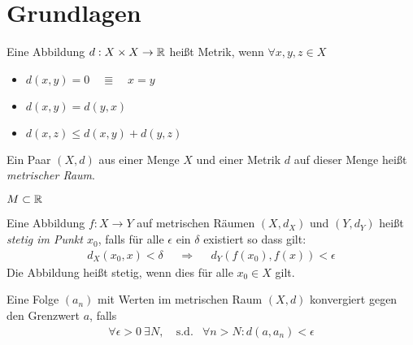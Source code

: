 \section{Grundlagen}
\begin{dfn}
    Eine Abbildung $d: X \times X \to \mathbb{R}$ heißt Metrik, wenn
    $\forall x,y,z \in X$
    \begin{itemize}
    \item $d(x, y) = 0 \quad \Equiv \quad x = y$
    \item $d(x, y) = d(y, x)$
    \item $d(x, z) \leq d(x, y) + d(y, z)$
    \end{itemize}
    Ein Paar $(X, d)$ aus einer Menge $X$ und einer Metrik $d$ auf dieser
    Menge heißt \emph{metrischer Raum}.    
\end{dfn}

\begin{bsp}
\end{bsp}

\begin{bsp}
\end{bsp}

\begin{bsp}[Unterraummetrik]
\end{bsp}

\begin{bsp}
    $M \subset \mathbb{R}$
\end{bsp}

\begin{dfn}[Stetigkeit]
    Eine Abbildung $f: X \to Y$ auf metrischen Räumen $(X,d_X)$ und $(Y, d_Y)$
    heißt \emph{stetig im Punkt $x_0$}, falls für alle $\epsilon$ ein $\delta$
    existiert so dass gilt:
    \begin{align*}
        d_X(x_0, x) < \delta& &\Rightarrow& &d_Y(f(x_0), f(x)) < \epsilon
    \end{align*}
    Die Abbildung heißt stetig, wenn dies für alle $x_0\in X$ gilt.
\end{dfn}

\begin{dfn}[Folgenkonvergenz]
    Eine Folge $(a_n)$ mit Werten im metrischen Raum $(X, d)$ konvergiert gegen den
    Grenzwert $a$, falls
    \begin{align*}
        \forall \epsilon > 0\ \exists N,\ &\mathrm{s.d.}& \forall n > N: d(a, a_n)
        < \epsilon
    \end{align*}
\end{dfn}

